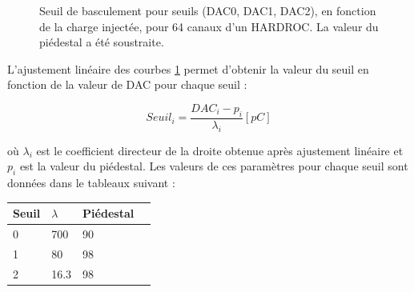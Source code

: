 \begin{figure}[ht!]
	\centering
	\hfill
	\hfill
	\caption{Seuil de basculement pour seuils (DAC0, DAC1, DAC2), en fonction de la charge injectée, pour \num{64} canaux d'un HARDROC. La valeur du piédestal a été soustraite.}
	\label{seuils}
\end{figure}%

L'ajustement linéaire des courbes \ref{seuils} permet d'obtenir la valeur du seuil en fonction de la valeur de DAC pour chaque seuil :

\begin{equation}
Seuil_{i}=\frac{DAC_{i}-p_{i}}{\lambda_{i}} [pC]
\end{equation}

où $\lambda_{i}$ est le coefficient directeur de la droite obtenue après ajustement linéaire et $p_{i}$ est la valeur du piédestal. Les valeurs de ces paramètres pour chaque seuil sont données dans le tableaux suivant :

\begin{table}[H]
	\centering
\begin{tabular}{|O|O|O|N}
	\hline 
	Seuil & $\lambda$ & Piédestal \\ 
	\hline 
	\num{0}&\num{700} &\num{90} \\ 
	\hline 
	\num{1}& \num{80} & \num{98} \\ 
	\hline 
	\num{2}&\num{16.3} &\num{98} \\ 
	\hline 
\end{tabular} 
\end{table}

